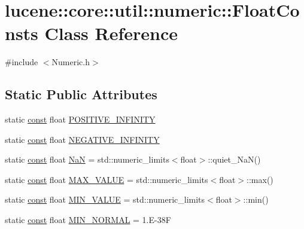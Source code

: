 \hypertarget{classlucene_1_1core_1_1util_1_1numeric_1_1FloatConsts}{}\section{lucene\+:\+:core\+:\+:util\+:\+:numeric\+:\+:Float\+Consts Class Reference}
\label{classlucene_1_1core_1_1util_1_1numeric_1_1FloatConsts}


{\ttfamily \#include $<$Numeric.\+h$>$}

\subsection*{Static Public Attributes}
\begin{DoxyCompactItemize}
\item 
static \mbox{\hyperlink{ZlibCrc32_8h_a2c212835823e3c54a8ab6d95c652660e}{const}} float \mbox{\hyperlink{classlucene_1_1core_1_1util_1_1numeric_1_1FloatConsts_a75ea31ef5c080a082a10b59f07b4eb0c}{P\+O\+S\+I\+T\+I\+V\+E\+\_\+\+I\+N\+F\+I\+N\+I\+TY}}
\item 
static \mbox{\hyperlink{ZlibCrc32_8h_a2c212835823e3c54a8ab6d95c652660e}{const}} float \mbox{\hyperlink{classlucene_1_1core_1_1util_1_1numeric_1_1FloatConsts_a34817e1fd3ed6cd545e0942d565bfac5}{N\+E\+G\+A\+T\+I\+V\+E\+\_\+\+I\+N\+F\+I\+N\+I\+TY}}
\item 
static \mbox{\hyperlink{ZlibCrc32_8h_a2c212835823e3c54a8ab6d95c652660e}{const}} float \mbox{\hyperlink{classlucene_1_1core_1_1util_1_1numeric_1_1FloatConsts_a302af30adff8f767ee41336252b712bf}{NaN}} = std\+::numeric\+\_\+limits$<$float$>$\+::quiet\+\_\+\+NaN()
\item 
static \mbox{\hyperlink{ZlibCrc32_8h_a2c212835823e3c54a8ab6d95c652660e}{const}} float \mbox{\hyperlink{classlucene_1_1core_1_1util_1_1numeric_1_1FloatConsts_a6fbf8697fc67683538ca7148f7ef8fb4}{M\+A\+X\+\_\+\+V\+A\+L\+UE}} = std\+::numeric\+\_\+limits$<$float$>$\+::max()
\item 
static \mbox{\hyperlink{ZlibCrc32_8h_a2c212835823e3c54a8ab6d95c652660e}{const}} float \mbox{\hyperlink{classlucene_1_1core_1_1util_1_1numeric_1_1FloatConsts_ab1e1437da563ab653ac53b172ad329fe}{M\+I\+N\+\_\+\+V\+A\+L\+UE}} = std\+::numeric\+\_\+limits$<$float$>$\+::min()
\item 
static \mbox{\hyperlink{ZlibCrc32_8h_a2c212835823e3c54a8ab6d95c652660e}{const}} float \mbox{\hyperlink{classlucene_1_1core_1_1util_1_1numeric_1_1FloatConsts_a33230f66e95cc314647c8e4885c2531c}{M\+I\+N\+\_\+\+N\+O\+R\+M\+AL}} = 1.\+E-\/38F

\end{DoxyCompactItemize}
